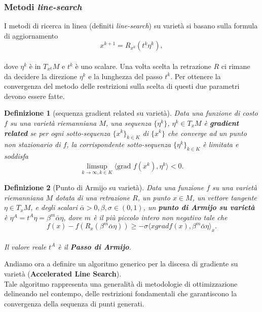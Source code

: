 \documentclass[a4paper, 12pt]{article}
\newtheorem{definition}{Definizione}
\begin{document}
\subsubsection{Metodi \emph{line-search}} \label{riemannian_linesearch}
I metodi di ricerca in linea (definiti \emph{line-search}) su varietà si basano sulla formula di aggiornamento\\
\[x^{k+1} = R_{x^k}(t^k \eta^k),\]\\
dove $\eta^k$ è in $T_{x^k}M$ e $t^k$ è uno scalare. Una volta scelta la retrazione $R$ ci rimane da decidere la direzione $\eta^k$ e la lunghezza del passo $t^k$. Per ottenere la convergenza del metodo delle restrizioni sulla scelta di questi due parametri devono essere fatte.\\
\begin{definition}[sequenza gradient related su varietà]
Data una funzione di costo $f$ su una varietà riemanniana $M$, una sequenza $\{\eta^k \}$, $\eta^k \in T_xM$ è \textbf{gradient related} se per ogni sotto-sequenza $\{x^k\}_{k \in K}$ di $\{x^k\}$ che converge ad un punto non stazionario di $f$, la corrispondente sotto-sequenza $\{\eta^k\}_{k \in K}$ è limitata e soddisfa\\
\[\limsup\limits_{k \to \infty, k \in K} \langle \mbox{grad } f(x^k), \eta^k \rangle < 0.\]
\end{definition}
\begin{definition}[Punto di Armijo su varietà]
Data una funzione $f$ su una varietà riemanniana $M$ dotata di una retrazione $R$, un punto $x \in M$, un vettore tangente $\eta \in T_xM$, e degli scalari $\bar{\alpha} > 0, \beta, \sigma \in (0, 1)$, un \textbf{punto di Armijo su varietà} è $\eta^A = t^{A}\eta = \beta^{m}\bar{\alpha}\eta$, dove $m$ è il più piccolo intero non negativo tale che\\
\[f(x) - f(R_x(\beta^{m}\bar{\alpha}\eta)) \geq -\sigma \langle x{grad } f(x), \beta^m\bar{\alpha}\eta \rangle_x.\]\\
Il valore reale $t^A$ è il \textbf{Passo di Armijo}.
\end{definition}
Andiamo ora a definire un algoritmo generico per la discesa di gradiente su varietà (\textbf{Accelerated Line Search}).\\
Tale algoritmo rappresenta una generalità di metodologie di ottimizzazione delineando nel contempo, delle restrizioni fondamentali che garantiscono la convergenza della sequenza di punti generati.\\
\end{document}
